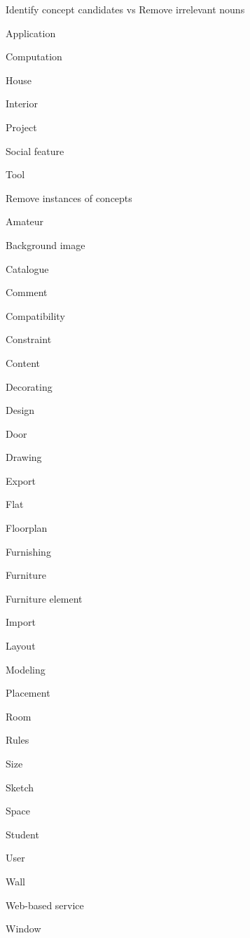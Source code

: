 \begin{paracol}{4}
			
			\bigskip
			
			Identify concept candidates  vs  Remove irrelevant nouns
			\begin{compactitem}
				\item Application
				\item Computation
				\item House
				\item Interior
				\item Project
				\item Social feature
				\item Tool
			\end{compactitem}
			\switchcolumn
			
			
			Remove instances of concepts\\
			\begin{compactitem}
				\item Amateur
				\item Background image
				\item Catalogue
				\item Comment
				\item Compatibility
				\item Constraint
				\item Content
				\item Decorating
				\item Design
				\item Door
				\item Drawing
				\item Export
				\item Flat
				\item Floorplan
				\item Furnishing
				\item Furniture
				\item Furniture element
				\item Import
				\item Layout
				\item Modeling
				\item Placement
				\item Room
				\item Rules
				\item Size
				\item Sketch
				\item Space
				\item Student
				\item User
				\item Wall
				\item Web-based service
				\item Window
			\end{compactitem}
			

\end{paracol}
